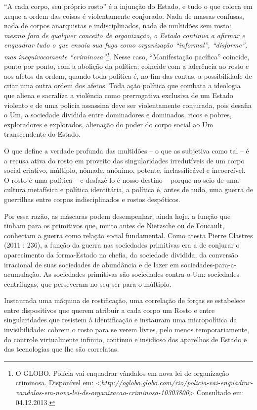 ``A cada corpo, seu próprio rosto'' é a injunção do Estado, e tudo o que
coloca em xeque a ordem das coisas é violentamente conjurado. Nada de
massas confusas, nada de corpos anarquistas e indisciplinados, nada de
multidões sem rosto: \emph{\emph{mesmo fora de qualquer conceito de
organização}}, \emph{\emph{o Estado continua a afirmar e enquadrar tudo
o que ensaia sua fuga como organização ``informal'', ``disforme'', mas
inequivocamente ``criminosa''}\emph{\footnote{O GLOBO. Polícia vai
  enquadrar vândalos em nova lei de organização criminosa. Disponível
  em:
  \textless{}{\emph{http://oglobo.globo.com/rio/policia-vai-enquadrar-vandalos-em-nova-lei-de-organizacao-criminosa-10303800}}\textgreater{}
  Consultado em: 04.12.2013.}}}. Nesse caso, ``Manifestação pacífica''
coincide, ponto por ponto, com a abolição da política; coincide com a
aderência ao rosto e aos afetos da ordem, quando toda política é, no fim
das contas, a possibilidade de criar uma outra ordem dos afetos. Toda
ação política que combata a ideologia que aliena e sacraliza a violência
como prerrogativa exclusiva de um Estado violento e de uma polícia
assassina deve ser violentamente conjurada, pois desafia o Um, a
sociedade dividida entre dominadores e dominados, ricos e pobres,
exploradores e explorados, alienação do poder do corpo social ao Um
transcendente do Estado.

O que define a verdade profunda das multidões -- o que as subjetiva como
tal -- é a recusa ativa do rosto em proveito das singularidades
irredutíveis de um corpo social criativo, múltiplo, nômade, anônimo,
potente, inclassificável e incoercível. O rosto é uma política -- e
desfazê-lo é nosso destino -- porque no seio de uma cultura metafísica e
política identitária, a política é, antes de tudo, uma guerra de
guerrilhas entre corpos indisciplinados e rostos despóticos.

Por essa razão, as máscaras podem desempenhar, ainda hoje, a função que
tinham para os primitivos que, muito antes de Nietzsche ou de Foucault,
conheciam a guerra como relação social fundamental. Como atesta Pierre
Clastres (2011 : 236), a função da guerra nas sociedades primitivas era
a de conjurar o aparecimento da forma-Estado na chefia, da sociedade
dividida, da conversão irracional de suas sociedades de abundância e de
lazer em sociedades-para-a-acumulação. As sociedades primitivas são
sociedades contra-o-Um: sociedades centrífugas, que perseveram no seu
ser-para-o-múltiplo.

Instaurada uma máquina de rostificação, uma correlação de forças se
estabelece entre dispositivos que querem atribuir a cada corpo um Rosto
e entre singularidades que resistem à identificação e instauram uma
micropolítica da invisibilidade: cobrem o rosto para se verem livres,
pelo menos temporariamente, do controle virtualmente infinito, contínuo
e insidioso dos aparelhos de Estado e das tecnologias que lhe são
correlatas.

